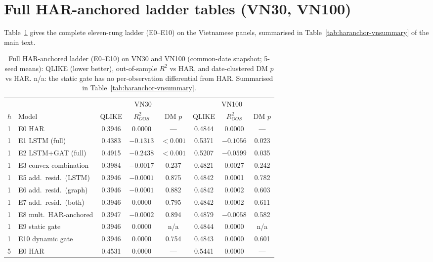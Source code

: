 \documentclass[runningheads]{llncs}
\begin{document}
\appendix
\section{Full HAR-anchored ladder tables (VN30, VN100)}\label{app:ladder}
Table~\ref{tab:haranchor-vndetail} gives the complete eleven-rung ladder
(E0--E10) on the Vietnamese panels, summarised in Table~\ref{tab:haranchor-vnsummary} of the main text.

\begin{table}[t]
\centering
\caption{Full HAR-anchored ladder (E0--E10) on VN30 and VN100 (common-date snapshot; 5-seed means):
QLIKE (lower better), out-of-sample $R^2$ vs HAR, and date-clustered DM $p$ vs HAR. n/a: the static gate has
no per-observation differential from HAR. Summarised in Table~\ref{tab:haranchor-vnsummary}.}
\label{tab:haranchor-vndetail}
\footnotesize
\setlength{\tabcolsep}{3pt}
\renewcommand{\arraystretch}{0.9}
\begin{tabular}{ll ccc ccc}
\toprule
& & \multicolumn{3}{c}{VN30} & \multicolumn{3}{c}{VN100} \\
\cmidrule(lr){3-5}\cmidrule(lr){6-8}
$h$ & Model & QLIKE & $R^2_{OOS}$ & DM $p$ & QLIKE & $R^2_{OOS}$ & DM $p$ \\
\midrule
1  & E0 HAR                 & 0.3946 & 0.0000  & --- & 0.4844 & 0.0000  & --- \\
1  & E1 LSTM (full)         & 0.4383 & $-0.1313$ & $<0.001$ & 0.5371 & $-0.1056$ & 0.023 \\
1  & E2 LSTM+GAT (full)     & 0.4915 & $-0.2438$ & $<0.001$ & 0.5207 & $-0.0599$ & 0.035 \\
1  & E3 convex combination  & 0.3984 & $-0.0017$ & 0.237 & 0.4821 & 0.0027  & 0.242 \\
1  & E5 add.\ resid.\ (LSTM)   & 0.3946 & $-0.0001$ & 0.875 & 0.4842 & 0.0001  & 0.782 \\
1  & E6 add.\ resid.\ (graph)  & 0.3946 & $-0.0001$ & 0.882 & 0.4842 & 0.0002  & 0.603 \\
1  & E7 add.\ resid.\ (both)   & 0.3946 & 0.0000  & 0.795 & 0.4842 & 0.0002  & 0.611 \\
1  & E8 mult.\ HAR-anchored    & 0.3947 & $-0.0002$ & 0.894 & 0.4879 & $-0.0058$ & 0.582 \\
1  & E9 static gate         & 0.3946 & 0.0000  & n/a & 0.4844 & 0.0000  & n/a \\
1  & E10 dynamic gate       & 0.3946 & 0.0000  & 0.754 & 0.4843 & 0.0000  & 0.601 \\
\midrule
5  & E0 HAR                 & 0.4531 & 0.0000  & --- & 0.5441 & 0.0000  & --- \\

\end{tabular}
\end{table}
\end{document}
